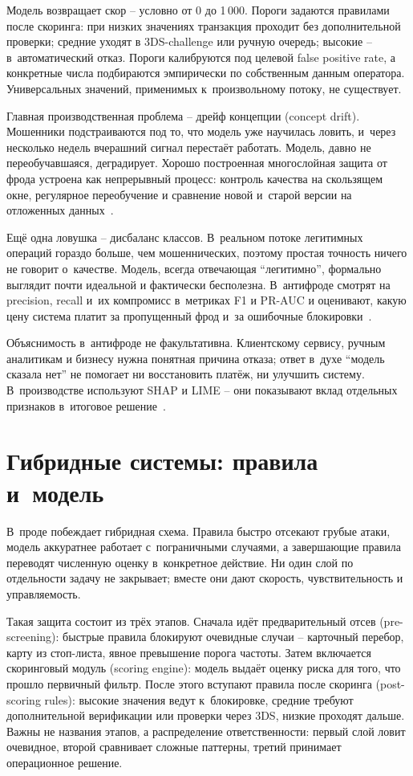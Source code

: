 Модель возвращает скор -- условно от 0 до 1\,000. Пороги задаются
правилами после скоринга: при низких значениях транзакция проходит
без дополнительной проверки; средние уходят в 3DS-challenge или
ручную очередь; высокие -- в~автоматический отказ. Пороги калибруются
под целевой false positive rate, а конкретные числа подбираются
эмпирически по собственным данным оператора. Универсальных значений,
применимых к~произвольному потоку, не существует.

Главная производственная проблема -- дрейф концепции (concept drift).
Мошенники подстраиваются под то, что модель уже научилась ловить,
и~через несколько недель вчерашний сигнал перестаёт работать. Модель,
давно не переобучавшаяся, деградирует. Хорошо построенная многослойная
защита от фрода устроена как непрерывный процесс: контроль качества
на скользящем окне, регулярное переобучение и сравнение новой и~старой
версии на отложенных данных~\cite{concept-drift-survey-2014}.

Ещё одна ловушка -- дисбаланс классов. В~реальном потоке легитимных
операций гораздо больше, чем мошеннических, поэтому простая точность
ничего не говорит о~качестве. Модель, всегда отвечающая
\enquote{легитимно}, формально выглядит почти идеальной и фактически
бесполезна. В~антифроде смотрят на precision, recall и~их компромисс
в~метриках F1 и PR-AUC и оценивают, какую цену система платит за
пропущенный фрод и~за ошибочные
блокировки~\cite{roc-pr-imbalanced-2024}.

Объяснимость в~антифроде не факультативна. Клиентскому сервису,
ручным аналитикам и бизнесу нужна понятная причина отказа; ответ
в~духе \enquote{модель сказала нет} не помогает ни восстановить
платёж, ни улучшить систему. В~производстве используют SHAP и LIME --
они показывают вклад отдельных признаков в~итоговое
решение~\cite{lime-2016,shap-2017}.

\section{Гибридные системы: правила и~модель}\label{sec:fraud-hybrid}

В~проде побеждает гибридная схема. Правила быстро отсекают грубые
атаки, модель аккуратнее работает с~пограничными случаями,
а завершающие правила переводят численную оценку в~конкретное
действие. Ни один слой по отдельности задачу не закрывает; вместе они
дают скорость, чувствительность и управляемость.

Такая защита состоит из трёх этапов. Сначала идёт предварительный
отсев (pre-screening): быстрые правила блокируют очевидные случаи --
карточный перебор, карту из стоп-листа, явное превышение порога
частоты. Затем включается скоринговый модуль (scoring engine):
модель выдаёт оценку риска для того, что прошло первичный фильтр.
После этого вступают правила после скоринга (post-scoring rules):
высокие значения ведут к~блокировке, средние требуют дополнительной
верификации или проверки через 3DS, низкие проходят дальше. Важны не
названия этапов, а распределение ответственности: первый слой ловит
очевидное, второй сравнивает сложные паттерны, третий принимает
операционное решение.

